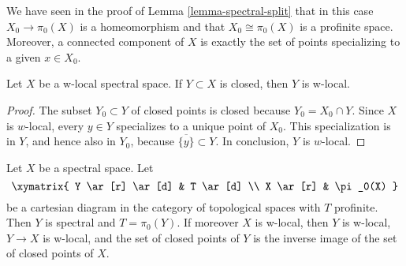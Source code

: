 \noindent
We have seen in the proof of Lemma \ref{lemma-spectral-split}
that in this case $X_0 \to \pi_0(X)$ is a homeomorphism and that
$X_0 \cong \pi_0(X)$ is a profinite space. Moreover, a connected
component of $X$ is exactly the set of points specializing to
a given $x \in X_0$.

\begin{lemma}
\label{lemma-closed-subspace-w-local}
Let $X$ be a w-local spectral space. If $Y \subset X$ is closed,
then $Y$ is w-local.
\end{lemma}

\begin{proof}
The subset $Y_0 \subset Y$ of closed points is closed because
$Y_0 = X_0 \cap Y$. Since $X$ is $w$-local, every $y \in Y$ specializes
to a unique point of $X_0$. This specialization is in $Y$, and hence
also in $Y_0$, because $\overline{\{y\}}\subset Y$. In conclusion, $Y$
is $w$-local.
\end{proof}

\begin{lemma}
\label{lemma-silly}
Let $X$ be a spectral space. Let
$$
\xymatrix{
Y \ar[r] \ar[d] & T \ar[d] \\
X \ar[r] & \pi_0(X)
}
$$
be a cartesian diagram in the category of topological spaces
with $T$ profinite. Then $Y$ is spectral and $T = \pi_0(Y)$.
If moreover $X$ is w-local, then $Y$ is w-local, $Y \to X$ is w-local,
and the set of closed points of $Y$ is the inverse image of the
set of closed points of $X$.
\end{lemma}

